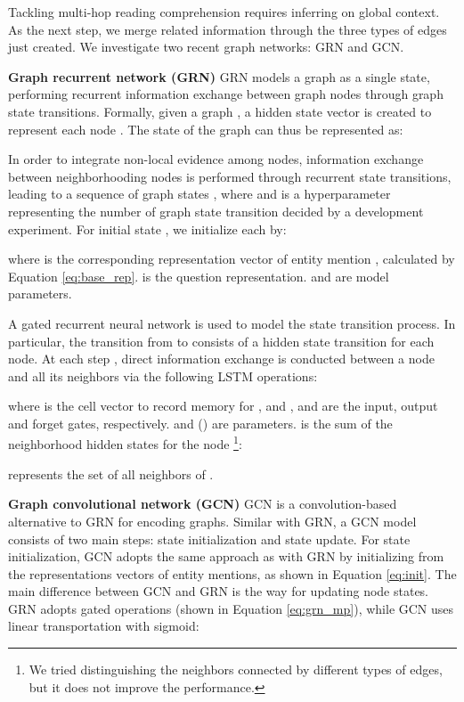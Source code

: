 \documentclass[letterpaper]{article}
\begin{document}
Tackling multi-hop reading comprehension requires inferring on global context.
As the next step, we merge related information through the three types of edges just created. 
We investigate two recent graph networks: GRN and GCN.

\vspace{0.5em}
\textbf{Graph recurrent network (GRN)} 
GRN
models a graph as a single state, performing recurrent information exchange between graph nodes through graph state transitions.
Formally, given a graph , a hidden state vector  is created to represent each node .
The state of the graph can thus be represented as:

In order to integrate non-local evidence among nodes, information exchange between neighborhooding nodes is performed through recurrent state transitions, leading to a sequence of graph states , where  and  is a hyperparameter representing the number of graph state transition decided by a development experiment.
For initial state , we initialize each  by:

where  is the corresponding representation vector of entity mention , calculated by Equation \ref{eq:base_rep}.  is the question representation.  and  are model parameters.


A gated recurrent neural network is used to model the state transition process. 
In particular, the transition from  to  consists of a hidden state transition for each node.
At each step , direct information exchange is conducted between a node and all its neighbors via the following LSTM \citep{hochreiter1997long} operations:

where  is the cell vector to record memory for , and ,  and  are the input, output and forget gates, respectively. 
 and  () are parameters.
 is the sum of the neighborhood hidden states for the node \footnote{We tried distinguishing the neighbors connected by different types of edges, but it does not improve the performance.}:

 represents the set of all neighbors of .


\vspace{0.5em}
\textbf{Graph convolutional network (GCN)} 
GCN 
is a convolution-based alternative to GRN for encoding graphs.
Similar with GRN, a GCN model consists of two main steps: state initialization and state update.
For state initialization, GCN adopts the same approach as with GRN by initializing from the representations vectors of entity mentions, as shown in Equation \ref{eq:init}.
The main difference between GCN and GRN is the way for updating node states.
GRN adopts gated operations (shown in Equation \ref{eq:grn_mp}), while GCN uses linear transportation with sigmoid:
\end{document}
